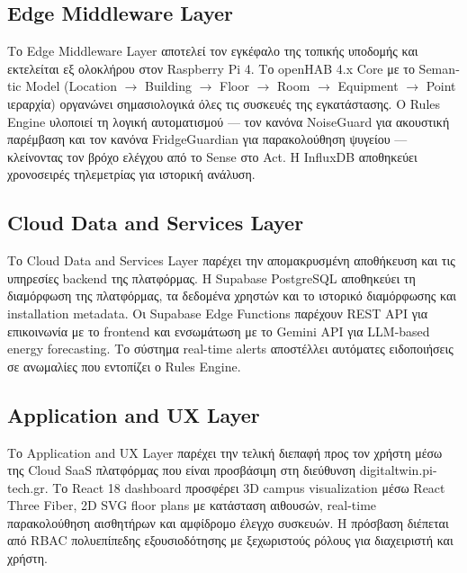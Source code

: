 \subsection{\texorpdfstring{\textlatin{Edge Middleware Layer}}{Edge Middleware Layer}}
Το \textlatin{Edge Middleware Layer} αποτελεί τον εγκέφαλο της τοπικής υποδομής και εκτελείται εξ ολοκλήρου στον \textlatin{Raspberry Pi 4}. Το \textlatin{openHAB 4.x Core} με το \textlatin{Semantic Model} (\textlatin{Location} $\rightarrow$ \textlatin{Building} $\rightarrow$ \textlatin{Floor} $\rightarrow$ \textlatin{Room} $\rightarrow$ \textlatin{Equipment} $\rightarrow$ \textlatin{Point} ιεραρχία) οργανώνει σημασιολογικά όλες τις συσκευές της εγκατάστασης. Ο \textlatin{Rules Engine} υλοποιεί τη λογική αυτοματισμού --- τον κανόνα \textlatin{NoiseGuard} για ακουστική παρέμβαση και τον κανόνα \textlatin{FridgeGuardian} για παρακολούθηση ψυγείου --- κλείνοντας τον βρόχο ελέγχου από το \textlatin{Sense} στο \textlatin{Act}. Η \textlatin{InfluxDB} αποθηκεύει χρονοσειρές τηλεμετρίας για ιστορική ανάλυση.

\subsection{\texorpdfstring{\textlatin{Cloud Data and Services Layer}}{Cloud Data and Services Layer}}
Το \textlatin{Cloud Data and Services Layer} παρέχει την απομακρυσμένη αποθήκευση και τις υπηρεσίες \textlatin{backend} της πλατφόρμας. Η \textlatin{Supabase PostgreSQL} αποθηκεύει τη διαμόρφωση της πλατφόρμας, τα δεδομένα χρηστών και το ιστορικό διαμόρφωσης και \textlatin{installation metadata}. Οι \textlatin{Supabase Edge Functions} παρέχουν \textlatin{REST API} για επικοινωνία με το \textlatin{frontend} και ενσωμάτωση με το \textlatin{Gemini API} για \textlatin{LLM-based energy forecasting}. Το σύστημα \textlatin{real-time alerts} αποστέλλει αυτόματες ειδοποιήσεις σε ανωμαλίες που εντοπίζει ο \textlatin{Rules Engine}.

\subsection{\texorpdfstring{\textlatin{Application and UX Layer}}{Application and UX Layer}}
Το \textlatin{Application and UX Layer} παρέχει την τελική διεπαφή προς τον χρήστη μέσω της \textlatin{Cloud SaaS} πλατφόρμας που είναι προσβάσιμη στη διεύθυνση \textlatin{digitaltwin.pi-tech.gr}. Το \textlatin{React 18 dashboard} προσφέρει \textlatin{3D campus visualization} μέσω \textlatin{React Three Fiber}, \textlatin{2D SVG floor plans} με κατάσταση αιθουσών, \textlatin{real-time} παρακολούθηση αισθητήρων και αμφίδρομο έλεγχο συσκευών. Η πρόσβαση διέπεται από \textlatin{RBAC} πολυεπίπεδης εξουσιοδότησης με ξεχωριστούς ρόλους για διαχειριστή και χρήστη.

